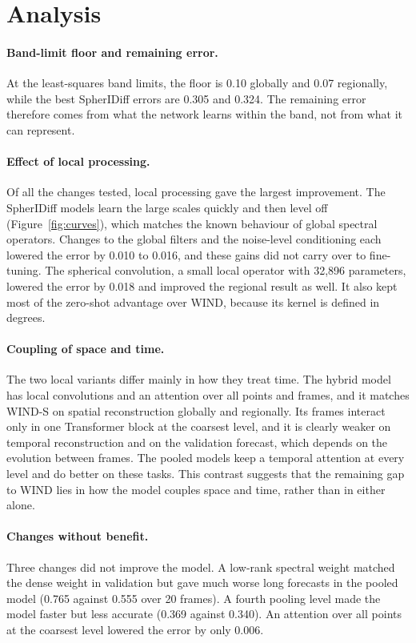 \documentclass{article}
\begin{document}
\section{Analysis}
\label{sec:analysis}

\paragraph{Band-limit floor and remaining error.}
At the least-squares band limits, the floor is 0.10 globally and 0.07 regionally, while the best SpherIDiff errors are 0.305 and 0.324. The remaining error therefore comes from what the network learns within the band, not from what it can represent.

\paragraph{Effect of local processing.}
Of all the changes tested, local processing gave the largest improvement. The SpherIDiff models learn the large scales quickly and then level off (Figure~\ref{fig:curves}), which matches the known behaviour of global spectral operators. Changes to the global filters and the noise-level conditioning each lowered the error by 0.010 to 0.016, and these gains did not carry over to fine-tuning. The spherical convolution, a small local operator with 32,896 parameters, lowered the error by 0.018 and improved the regional result as well. It also kept most of the zero-shot advantage over WIND, because its kernel is defined in degrees.

\paragraph{Coupling of space and time.}
The two local variants differ mainly in how they treat time. The hybrid model has local convolutions and an attention over all points and frames, and it matches WIND-S on spatial reconstruction globally and regionally. Its frames interact only in one Transformer block at the coarsest level, and it is clearly weaker on temporal reconstruction and on the validation forecast, which depends on the evolution between frames. The pooled models keep a temporal attention at every level and do better on these tasks. This contrast suggests that the remaining gap to WIND lies in how the model couples space and time, rather than in either alone.

\paragraph{Changes without benefit.}
Three changes did not improve the model. A low-rank spectral weight matched the dense weight in validation but gave much worse long forecasts in the pooled model (0.765 against 0.555 over 20 frames). A fourth pooling level made the model faster but less accurate (0.369 against 0.340). An attention over all points at the coarsest level lowered the error by only 0.006.
\end{document}
